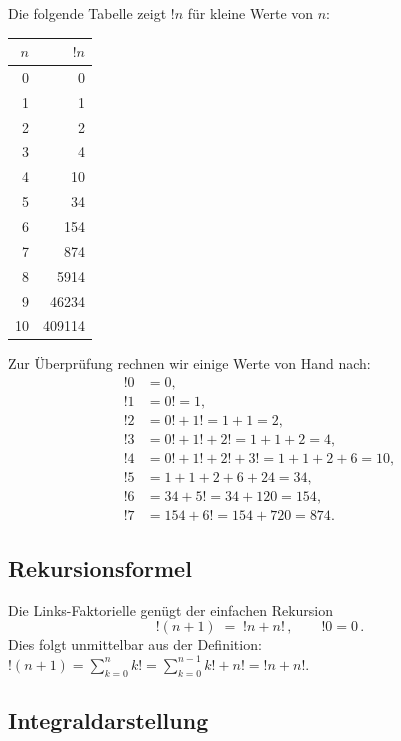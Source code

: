 \documentclass[12pt,a4paper]{amsart}
\theoremstyle{definition}
\begin{document}
Die folgende Tabelle zeigt $!n$ für kleine Werte von $n$:

\begin{center}
\begin{tabular}{@{}rr@{}}
\toprule
$n$ & $!n$ \\
\midrule
0 & 0 \\
1 & 1 \\
2 & 2 \\
3 & 4 \\
4 & 10 \\
5 & 34 \\
6 & 154 \\
7 & 874 \\
8 & 5914 \\
9 & 46234 \\
10 & 409114 \\
\bottomrule
\end{tabular}
\end{center}

Zur Überprüfung rechnen wir einige Werte von Hand nach:
\begin{align*}
  !0 &= 0,\\
  !1 &= 0! = 1,\\
  !2 &= 0! + 1! = 1 + 1 = 2,\\
  !3 &= 0! + 1! + 2! = 1 + 1 + 2 = 4,\\
  !4 &= 0! + 1! + 2! + 3! = 1 + 1 + 2 + 6 = 10,\\
  !5 &= 1 + 1 + 2 + 6 + 24 = 34,\\
  !6 &= 34 + 5! = 34 + 120 = 154,\\
  !7 &= 154 + 6! = 154 + 720 = 874.
\end{align*}

\subsection{Rekursionsformel}

Die Links-Faktori\-elle genügt der einfachen Rekursion
\begin{equation}\label{eq:rekursion}
  !(n+1) \;=\; !n + n!\,, \qquad !0 = 0\,.
\end{equation}
Dies folgt unmittelbar aus der Definition:
$!(n+1) = \sum_{k=0}^{n} k! = \sum_{k=0}^{n-1} k! + n! = !n + n!$.

\subsection{Integraldarstellung}
\end{document}
